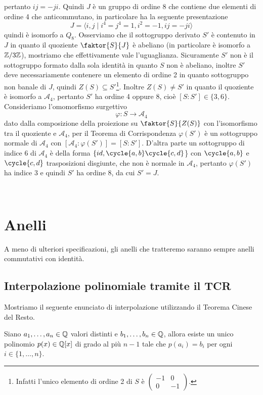 \documentclass[11pt]{scrartcl}
\begin{document}
	pertanto $ij = -ji$. Quindi $J$ è un gruppo di ordine $8$ che contiene due
	elementi di ordine 4 che anticommutano, in particolare ha la seguente presentazione
	\[
	J = \langle i, j\mid i^4 = j^4 = 1, i^2 = -1, ij = -ji\rangle
	\]
	quindi è isomorfo a $Q_8$. Osserviamo che il sottogruppo derivato $S'$ è 
	contenuto in $J$ in quanto il quoziente $\faktor{S}{J}$ è abeliano (in particolare
	è isomorfo a $\mathbb{Z}/{3}\mathbb{Z}$), mostriamo che effettivamente vale l'uguaglianza. 
	Sicuramente $S'$ non è il sottogruppo formato dalla sola identità in quanto 
	$S$ non è abeliano, inoltre $S'$ deve necessariamente contenere un elemento di 
	ordine 2 in quanto sottogruppo non banale di $J$, quindi $Z(S) \subseteq S'$\footnote{
		Infatti l'unico elemento di ordine 2 di $S$ è $\begin{pmatrix}-1 & 0\\
			0 & -1\end{pmatrix}$.
	}. Inoltre $Z(S) \neq S'$ in quanto il quoziente è isomorfo a $\mathcal{A}_4$,
	pertanto $S'$ ha ordine 4 oppure 8, cioè $[S: S'] \in \{3, 6\}$.
	Consideriamo l'omomorfismo surgettivo 
	\[
	\varphi: S \longrightarrow \mathcal{A}_4
	\]
	dato dalla composizione della proiezione su $\faktor{S}{Z(S)}$ con l'isomorfismo
	tra il quoziente e $\mathcal{A}_4$, per il Teorema di Corrispondenza $\varphi(S')$
	è un sottogruppo normale di $\mathcal{A}_4$ con 
	$[\mathcal{A}_4: \varphi(S')] = [S: S']$. D'altra parte un sottogruppo di 
	indice 6 di $\mathcal{A}_4$ è della forma $\{id, \cycle{a, b}\cycle{c, d}$\}
	con $\cycle{a, b}$ e $\cycle{c, d}$ trasposizioni disgiunte, che non è normale
	in $\mathcal{A}_4$, pertanto $\varphi(S')$ ha indice 3 e quindi $S'$ ha ordine
	8, da cui $S' = J$.
	
	
	\newpage
	\ %
	\newpage
	
	\section{Anelli}
	
	A meno di ulteriori specificazioni, gli anelli che tratteremo saranno sempre 
	anelli commutativi con identità.
	
	\subsection{Interpolazione polinomiale tramite il TCR}
	
	Mostriamo il seguente enunciato di interpolazione utilizzando il Teorema
	Cinese del Resto.
	
	\begin{proposition}
		Siano $a_1, \ldots, a_n \in \mathbb Q$ valori distinti e $b_1, \ldots, b_n \in \mathbb Q$,
		allora esiste un unico polinomio $p(x) \in \mathbb Q[x]$ di grado al più $n - 1$
		tale che $p(a_i) = b_i$ per ogni $i \in \{1, \ldots, n\}$. 
	\end{proposition}
	
\end{document}
